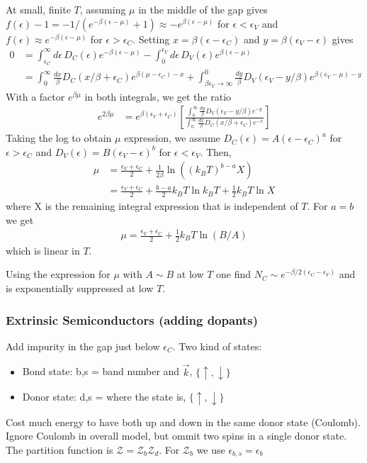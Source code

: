 \documentclass[a4paper, english, 12pt]{article}
\newcommand{\eps}{\epsilon}
\newcommand{\bracket}[1]{\left[ #1 \right]}
\newcommand{\curly}[1]{\{ #1 \} }
\newcommand{\Z}{\mathcal{Z}}
\begin{document}
\begin{multicols*}{2}
At small, finite $T$, assuming $\mu$ in the middle of the gap gives $f(\eps)-1=-1/(e^{-\beta(\eps-\mu)}+1)\approx-e^{\beta(\eps-\mu)}$ for $\eps<\eps_V$ and $f(\eps)\approx e^{-\beta(\eps-\mu)}$ for $\eps>\eps_C$. Setting $x=\beta(\eps-\eps_C)$ and $y=\beta(\eps_V-\eps)$ gives 
\begin{align*}
    0 &= \int_{\eps_C}^\infty d\eps\,D_C(\eps) e^{-\beta(\eps-\mu)} - \int_0^{\eps_V} d\eps\,D_V(\eps) e^{\beta(\eps-\mu)} \\
    &= \int_0^\infty \frac{dx}{\beta} D_C(x/\beta+\eps_C) e^{\beta(\mu-\eps_C)-x} + \int_{\beta\eps_V\to\infty}^0 \frac{dy}{\beta} D_V(\eps_V-y/\beta) e^{\beta(\eps_V-\mu)-y} 
\end{align*}
With a factor $e^{\beta\mu}$ in both integrals, we get the ratio 
\begin{align*}
    e^{2\beta\mu} &= e^{\beta(\eps_V+\eps_C)} \bracket{\frac{\int_0^\infty \frac{dy}{\beta} D_V(\eps_V-y/\beta) e^{-y} }{\int_0^\infty \frac{dx}{\beta} D_C(x/\beta+\eps_C) e^{-x}}}
\end{align*}
Taking the log to obtain $\mu$ expression, we assume $D_C(\eps)=A(\eps-\eps_C)^a$ for $\eps>\eps_C$ and $D_V(\eps)=B(\eps_V-\eps)^b$ for $\eps<\eps_V$. Then, 
\begin{align*}
    \mu &= \frac{\eps_V+\eps_C}{2} + \frac{1}{2\beta} \ln((k_B T)^{b-a} X) \\
    &= \frac{\eps_V+\eps_C}{2} + \frac{b-a}{2} k_B T \ln k_B T +\frac{1}{2}k_B T \ln X
\end{align*}
where X is the remaining integral expression that is independent of $T$. For $a=b$ we get 
\begin{align*}
    \mu = \frac{\eps_V+\eps_C}{2} + \frac{1}{2}k_B T \ln(B/A)
\end{align*}
which is linear in $T$. 

Using the expression for $\mu$ with $A\sim B$ at low $T$ one find $N_C \sim e^{-\beta/2 (\eps_C-\eps_V)}$ and is exponentially suppressed at low $T$. 


\subsubsection*{\tiny Extrinsic Semiconductors (adding dopants)}
Add impurity in the gap just below $\eps_C$. Two kind of states:
\begin{itemize}
    \item Bond state: b,s = band number and $\vec{k}$, $\curly{\uparrow,\downarrow}$  
    \item Donor state: d,s = where the state is, $\curly{\uparrow,\downarrow}$
\end{itemize}
Cost much energy to have both up and down in the same donor state (Coulomb). Ignore Coulomb in overall model, but ommit two spins in a single donor state. The partition function is $\Z=\Z_b \Z_d$. For $\Z_b$ we use $\eps_{b,s}=\eps_b$


\end{multicols*}
\end{document}
